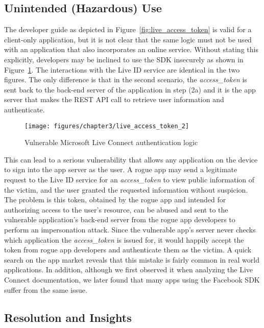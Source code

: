 \subsection{Unintended (Hazardous) Use}

The developer guide as depicted in Figure~\ref{fig:live_access_token} is valid for a client-only application, but it is not clear that the same logic must not be used with an application that also incorporates an online service.  Without stating this explicitly, developers may be inclined to use the SDK insecurely as shown in Figure~\ref{fig:live_access_token_2}. The interactions with the Live ID service are identical in the two figures.  The only difference is that in the second scenario, the \emph{access\_token} is sent back to the back-end server of the application in step (2a) and it is the app server that makes the REST API call to retrieve user information and authenticate. 

\begin{figure}[hbt]
\centering
\texttt{[image: figures/chapter3/live\_access\_token\_2]}
\caption{Vulnerable Microsoft Live Connect authentication logic}
\label{fig:live_access_token_2}
\end{figure}

This can lead to a serious vulnerability that allows any application on the device to sign into the app server as the user. A rogue app may send a legitimate request to the Live ID service for an \emph{access\_token} to view public information of the victim, and the user granted the requested information without suspicion.  The problem is this token, obtained by the rogue app and intended for authorizing access to the user's resource, can be abused and sent to the vulnerable application's back-end server from the rogue app developers to perform an impersonation attack.  Since the vulnerable app's server never checks which application the \emph{access\_token} is issued for, it would happily accept the token from rogue app developers and authenticate them as the victim.  A quick search on the app market reveals that this mistake is fairly common in real world applications.  In addition, although we first observed it when analyzing the Live Connect documentation, we later found that many apps using the Facebook SDK suffer from the same issue.  

\subsection{Resolution and Insights}

